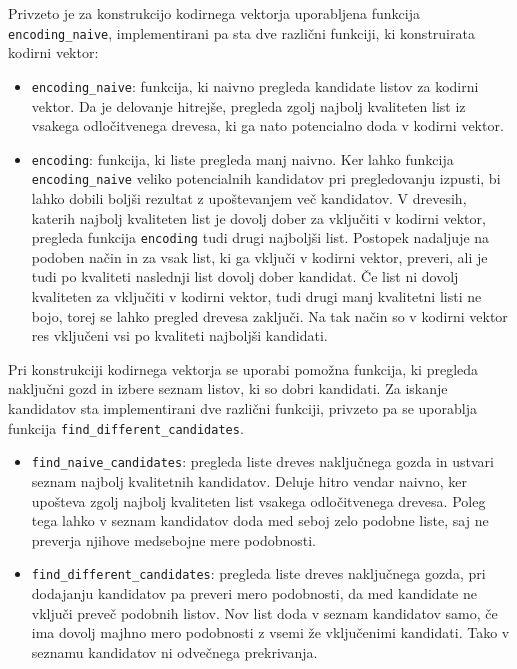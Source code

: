 \documentclass[12pt,a4paper]{article}
\begin{document}
Privzeto je za konstrukcijo kodirnega vektorja uporabljena funkcija \texttt{encoding\_naive},
implementirani pa sta dve različni funkciji, ki konstruirata kodirni vektor:

\begin{itemize}
	\item \texttt{encoding\_naive}: funkcija, ki naivno pregleda kandidate listov za kodirni vektor. 
	Da je delovanje hitrejše, pregleda zgolj najbolj kvaliteten list iz vsakega odločitvenega drevesa, ki ga nato potencialno doda v kodirni vektor.

	\item \texttt{encoding}: funkcija, ki liste pregleda manj naivno.
	Ker lahko funkcija \texttt{encoding\_naive} veliko potencialnih kandidatov pri pregledovanju izpusti, bi lahko dobili boljši rezultat z upoštevanjem več kandidatov.
	V drevesih, katerih najbolj kvaliteten list je dovolj dober za vključiti v kodirni vektor, pregleda funkcija \texttt{encoding} tudi drugi najboljši list.
	Postopek nadaljuje na podoben način in za vsak list, ki ga vključi v kodirni vektor, preveri, ali je tudi po kvaliteti naslednji list dovolj dober kandidat.
	Če list ni dovolj kvaliteten za vključiti v kodirni vektor, tudi drugi manj kvalitetni listi ne bojo, torej se lahko pregled drevesa zaključi.
	Na tak način so v kodirni vektor res vključeni vsi po kvaliteti najboljši kandidati.
\end{itemize}

Pri konstrukciji kodirnega vektorja se uporabi pomožna funkcija, ki pregleda naključni gozd in izbere seznam listov, ki so dobri kandidati.
Za iskanje kandidatov sta implementirani dve različni funkciji, privzeto pa se uporablja funkcija \texttt{find\_different\_candidates}.

\begin{itemize}
	\item \texttt{find\_naive\_candidates}: pregleda liste dreves naključnega gozda in ustvari seznam najbolj kvalitetnih kandidatov.
	Deluje hitro vendar naivno, ker upošteva zgolj najbolj kvaliteten list vsakega odločitvenega drevesa.
	Poleg tega lahko v seznam kandidatov doda med seboj zelo podobne liste, saj ne preverja njihove medsebojne mere podobnosti.

	\item \texttt{find\_different\_candidates}: pregleda liste dreves naključnega gozda, 
	pri dodajanju kandidatov pa preveri mero podobnosti, da med kandidate ne vključi preveč podobnih listov.
	Nov list doda v seznam kandidatov samo, če ima dovolj majhno mero podobnosti z vsemi že vključenimi kandidati.
	Tako v seznamu kandidatov ni odvečnega prekrivanja.
\end{itemize}
\end{document}
